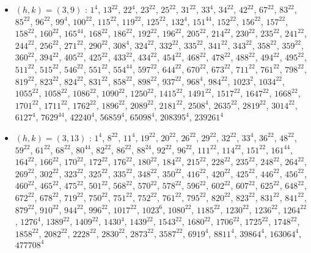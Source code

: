 \begin{itemize}
\item $(h,k)=(3,9)$ : $1^{4}$, $13^{22}$, $22^{4}$, $23^{22}$, $25^{22}$, $31^{22}$, $33^{4}$, $34^{22}$, $42^{22}$, $67^{22}$, $83^{22}$, $85^{22}$, $96^{22}$, $99^{4}$, $100^{22}$, $115^{22}$, $119^{22}$, $125^{22}$, $132^{4}$, $151^{44}$, $152^{22}$, $156^{22}$, $157^{22}$, $158^{22}$, $160^{22}$, $165^{44}$, $168^{22}$, $186^{22}$, $192^{22}$, $196^{22}$, $205^{22}$, $214^{22}$, $230^{22}$, $235^{22}$, $241^{22}$, $244^{22}$, $256^{22}$, $271^{22}$, $290^{22}$, $308^{4}$, $324^{22}$, $332^{22}$, $335^{22}$, $341^{22}$, $343^{22}$, $358^{22}$, $359^{22}$, $360^{22}$, $394^{22}$, $405^{22}$, $425^{22}$, $433^{22}$, $434^{22}$, $454^{22}$, $468^{22}$, $478^{22}$, $488^{22}$, $494^{22}$, $495^{22}$, $511^{22}$, $515^{22}$, $546^{22}$, $551^{22}$, $554^{44}$, $597^{22}$, $644^{22}$, $670^{22}$, $673^{22}$, $711^{22}$, $761^{22}$, $798^{22}$, $819^{22}$, $823^{22}$, $824^{22}$, $831^{22}$, $858^{22}$, $898^{22}$, $937^{22}$, $968^{4}$, $984^{22}$, $1023^{2}$, $1034^{22}$, $1055^{22}$, $1058^{22}$, $1086^{22}$, $1090^{22}$, $1250^{22}$, $1415^{22}$, $1491^{22}$, $1517^{22}$, $1647^{22}$, $1668^{22}$, $1701^{22}$, $1711^{22}$, $1762^{22}$, $1896^{22}$, $2089^{22}$, $2181^{22}$, $2508^{4}$, $2635^{22}$, $2819^{22}$, $3014^{22}$, $6127^{4}$, $7629^{44}$, $42240^{4}$, $56859^{4}$, $65098^{4}$, $208395^{4}$, $239261^{4}$
\item $(h,k)=(3,13)$ : $1^{4}$, $8^{22}$, $11^{4}$, $19^{22}$, $20^{22}$, $26^{22}$, $29^{22}$, $32^{22}$, $33^{4}$, $36^{22}$, $48^{22}$, $59^{22}$, $61^{22}$, $68^{22}$, $80^{44}$, $82^{22}$, $86^{22}$, $88^{24}$, $92^{22}$, $96^{22}$, $111^{22}$, $114^{22}$, $151^{22}$, $161^{44}$, $164^{22}$, $166^{22}$, $170^{22}$, $172^{22}$, $176^{22}$, $180^{22}$, $184^{22}$, $215^{22}$, $228^{22}$, $235^{22}$, $248^{22}$, $264^{22}$, $269^{22}$, $302^{22}$, $323^{22}$, $325^{22}$, $335^{22}$, $348^{22}$, $350^{22}$, $416^{22}$, $420^{22}$, $425^{22}$, $446^{22}$, $456^{22}$, $460^{22}$, $465^{22}$, $475^{22}$, $501^{22}$, $568^{22}$, $570^{22}$, $578^{22}$, $596^{22}$, $602^{22}$, $607^{22}$, $625^{22}$, $648^{22}$, $672^{22}$, $678^{22}$, $719^{22}$, $750^{22}$, $751^{22}$, $752^{22}$, $761^{22}$, $795^{22}$, $820^{22}$, $823^{22}$, $831^{22}$, $841^{22}$, $879^{22}$, $910^{22}$, $944^{22}$, $996^{22}$, $1017^{22}$, $1023^{6}$, $1080^{22}$, $1185^{22}$, $1230^{22}$, $1236^{22}$, $1264^{22}$, $1276^{4}$, $1389^{22}$, $1409^{22}$, $1430^{4}$, $1439^{22}$, $1543^{22}$, $1680^{22}$, $1706^{22}$, $1725^{22}$, $1748^{22}$, $1858^{22}$, $2082^{22}$, $2228^{22}$, $2830^{22}$, $2873^{22}$, $3587^{22}$, $6919^{4}$, $8811^{4}$, $39864^{4}$, $163064^{4}$, $477708^{4}$

\end{itemize}
